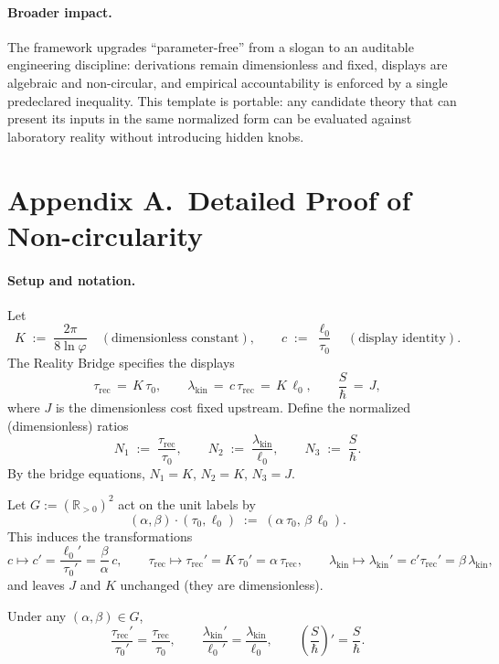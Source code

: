 \documentclass[11pt]{article}
\begin{document}
\paragraph{Broader impact.}
The framework upgrades “parameter-free” from a slogan to an auditable engineering discipline: derivations remain dimensionless and fixed, displays are algebraic and non-circular, and empirical accountability is enforced by a single predeclared inequality. This template is portable: any candidate theory that can present its inputs in the same normalized form can be evaluated against laboratory reality without introducing hidden knobs.

\appendix

\section*{Appendix A.\ Detailed Proof of Non-circularity}

\paragraph{Setup and notation.}
Let
\[
K\;:=\;\frac{2\pi}{8\ln\varphi}\quad(\text{dimensionless constant}),\qquad
c\;:=\;\frac{\ell_{0}}{\tau_{0}}\quad(\text{display identity}).
\]
The Reality Bridge specifies the displays
\[
\tau_{\mathrm{rec}}\,=\,K\,\tau_{0},\qquad
\lambda_{\mathrm{kin}}\,=\,c\,\tau_{\mathrm{rec}}\,=\,K\,\ell_{0},\qquad
\frac{S}{\hbar}\,=\,J,
\]
where \(J\) is the dimensionless cost fixed upstream. Define the normalized (dimensionless) ratios
\[
N_{1}\;:=\;\frac{\tau_{\mathrm{rec}}}{\tau_{0}},\qquad
N_{2}\;:=\;\frac{\lambda_{\mathrm{kin}}}{\ell_{0}},\qquad
N_{3}\;:=\;\frac{S}{\hbar}.
\]
By the bridge equations, \(N_{1}=K\), \(N_{2}=K\), \(N_{3}=J\).

\begin{definition}
Let \(G:=(\mathbb{R}_{>0})^{2}\) act on the unit labels by
\[
(\alpha,\beta)\cdot(\tau_{0},\ell_{0})\;:=\;(\alpha\,\tau_{0},\,\beta\,\ell_{0}).
\]
This induces the transformations
\[
c\mapsto c'=\frac{\ell_{0}'}{\tau_{0}'}=\frac{\beta}{\alpha}\,c,\qquad
\tau_{\mathrm{rec}}\mapsto\tau_{\mathrm{rec}}'=K\,\tau_{0}'=\alpha\,\tau_{\mathrm{rec}},\qquad
\lambda_{\mathrm{kin}}\mapsto\lambda_{\mathrm{kin}}'=c'\tau_{\mathrm{rec}}'=\beta\,\lambda_{\mathrm{kin}},
\]
and leaves \(J\) and \(K\) unchanged (they are dimensionless).
\end{definition}

\begin{lemma}\label{lem:equivariance}
Under any \((\alpha,\beta)\in G\),
\[
\frac{\tau_{\mathrm{rec}}'}{\tau_{0}'}=\frac{\tau_{\mathrm{rec}}}{\tau_{0}},\qquad
\frac{\lambda_{\mathrm{kin}}'}{\ell_{0}'}=\frac{\lambda_{\mathrm{kin}}}{\ell_{0}},\qquad
\left(\frac{S}{\hbar}\right)'\!=\frac{S}{\hbar}.
\]
\end{lemma}
\end{document}
